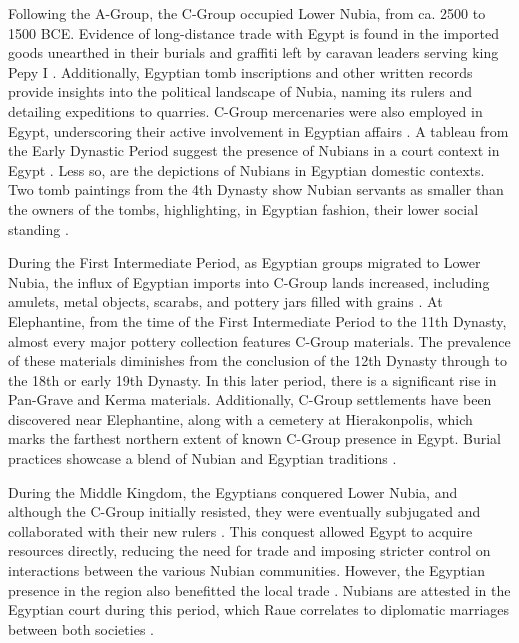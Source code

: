 Following the A-Group, the C-Group occupied Lower Nubia, from ca. 2500 to 1500 BCE. Evidence of long-distance trade with Egypt is found in the imported goods unearthed in their burials and graffiti left by caravan leaders serving king Pepy I \parencite[p.~166]{hafsaasCGroupPeopleLower2020}. Additionally, Egyptian tomb inscriptions and other written records provide insights into the political landscape of Nubia, naming its rulers and detailing expeditions to quarries. C-Group mercenaries were also employed in Egypt, underscoring their active involvement in Egyptian affairs \parencite[p.~96]{seidlmayerNubierImAgytischen2002}. A tableau from the Early Dynastic Period suggest the presence of Nubians in a court context in Egypt \parencite[p.~569]{Raue2019b}. Less so, are the depictions of Nubians in Egyptian domestic contexts. Two tomb paintings from the 4th Dynasty show Nubian servants as smaller than the owners of the tombs, highlighting, in Egyptian fashion, their lower social standing \parencite[p.~98-99]{seidlmayerNubierImAgytischen2002}.

During the First Intermediate Period, as Egyptian groups migrated to Lower Nubia, the influx of Egyptian imports into C-Group lands increased, including amulets, metal objects, scarabs, and pottery jars filled with grains \parencites[p.~303]{Raue2019a}[p.~171]{hafsaasCGroupPeopleLower2020}. At Elephantine, from the time of the First Intermediate Period to the 11th Dynasty, almost every major pottery collection features C-Group materials. The prevalence of these materials diminishes from the conclusion of the 12th Dynasty through to the 18th or early 19th Dynasty. In this later period, there is a significant rise in Pan-Grave and Kerma materials. Additionally, C-Group settlements have been discovered near Elephantine, along with a cemetery at Hierakonpolis, which marks the farthest northern extent of known C-Group presence in Egypt. Burial practices showcase a blend of Nubian and Egyptian traditions \parencite[p.~292]{meurerNubiansEgyptEarly2020}.

During the Middle Kingdom, the Egyptians conquered Lower Nubia, and although the C-Group initially resisted, they were eventually subjugated and collaborated with their new rulers \parencite[p.~172]{hafsaasCGroupPeopleLower2020}. This conquest allowed Egypt to acquire resources directly, reducing the need for trade and imposing stricter control on interactions between the various Nubian communities. However, the Egyptian presence in the region also benefitted the local trade \parencite[p.~138]{naserStructuresRealitiesEgyptianNubian2013}. Nubians are attested in the Egyptian court during this period, which Raue correlates to diplomatic marriages between both societies \parencite[p.~572]{Raue2019b}.

